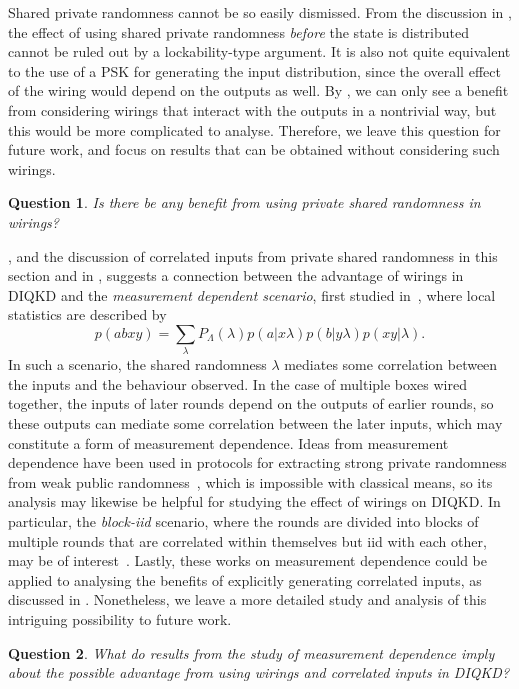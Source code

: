 \documentclass[10pt, a4paper]{article}
\numberwithin{equation}{section} %
\theoremstyle{definition}
\theoremstyle{plain}
\newtheorem{question}{Question}
\newcommand{\?}{\mathrel{?}} %
\begin{document}
                      Shared private randomness cannot be so easily dismissed. From the discussion in , the effect of using shared private randomness \emph{before} the state is distributed cannot be ruled out by a lockability-type argument. It is also not quite equivalent to the use of a PSK for generating the input distribution, since the overall effect of the wiring would depend on the outputs as well. By , we can only see a benefit from considering wirings that interact with the outputs in a nontrivial way, but this would be more complicated to analyse. Therefore, we leave this question for future work, and focus on results that can be obtained without considering such wirings.
                      \begin{question}
                        Is there be any benefit from using private shared randomness in wirings?
                      \end{question}

                      , and the discussion of correlated inputs from private shared randomness in this section and in , suggests a connection between the advantage of wirings in DIQKD and the \emph{measurement dependent scenario}, first studied in~\cite{RelaxedBell}, where local statistics are described by~\cite[Eq. 2]{MDLBeyondIID}
                      \begin{equation}
                        p(abxy) = \sum_{\lambda} P_{\Lambda}(\lambda) p(a|x\lambda) p(b|y\lambda) p(xy|\lambda).
                      \end{equation}
                      In such a scenario, the shared randomness \(\lambda\) mediates some correlation between the inputs and the behaviour observed. In the case of multiple boxes wired together, the inputs of later rounds depend on the outputs of earlier rounds, so these outputs can mediate some correlation between the later inputs, which may constitute a form of measurement dependence. Ideas from measurement dependence have been used in protocols for extracting strong private randomness from weak public randomness~\cite{DIRA}, which is impossible with classical means, so its analysis may likewise be helpful for studying the effect of wirings on DIQKD\@. In particular, the  \emph{block-iid} scenario, where the rounds are divided into blocks of multiple rounds that are correlated within themselves but iid with each other, may be of interest~\cite{MDLBeyondIID}. Lastly, these works on measurement dependence could be applied to analysing the benefits of explicitly generating correlated inputs, as discussed in . Nonetheless, we leave a more detailed study and analysis of this intriguing possibility to future work.
                      \begin{question}
                        What do results from the study of measurement dependence imply about the possible advantage from using wirings and correlated inputs in DIQKD\@?
                      \end{question}
\end{document}
